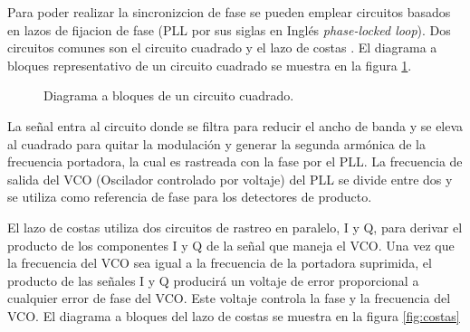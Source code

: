Para poder realizar la sincronizcion de fase se pueden emplear circuitos basados en lazos de fijacion de fase (PLL por sus siglas
en Ingl\'es \emph{phase-locked loop}). Dos circuitos comunes son el circuito cuadrado y el lazo de costas \cite{perez}. El
diagrama a bloques representativo de un circuito cuadrado se muestra en la figura \ref{fig:ccuad}.

\begin{figure}[htp]
\centering
    \vspace{0.3in}
    \caption{Diagrama a bloques de un circuito cuadrado. \protect\cite{perez}}
    \label{fig:ccuad}
\end{figure}

La se\~nal entra al circuito donde se filtra para reducir el ancho de banda y se eleva al cuadrado para quitar la modulaci\'on y
generar la segunda arm\'onica de la frecuencia portadora, la cual es rastreada con la fase por el PLL. La frecuencia de salida del
VCO (Oscilador controlado por voltaje) del PLL se divide entre dos y se utiliza como referencia de fase para los detectores de
producto.

El lazo de costas utiliza dos circuitos de rastreo en paralelo, I y Q, para derivar el producto de los componentes I y Q de la
se\~nal que maneja el VCO. Una vez que la frecuencia del VCO sea igual a la frecuencia de la portadora suprimida, el producto de
las se\~nales I y Q producir\'a un voltaje de error proporcional a cualquier error de fase del VCO. Este voltaje controla la fase
y la frecuencia del VCO. El diagrama a bloques del lazo de costas se muestra en la figura \ref{fig:costas}

